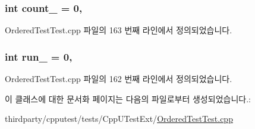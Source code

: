 \subsubsection[{\texorpdfstring{count\+\_\+}{count_}}]{\setlength{\rightskip}{0pt plus 5cm}int count\+\_\+ = 0\hspace{0.3cm}{\ttfamily [static]}, {\ttfamily [private]}}\hypertarget{class_ordered_test_testing_fixture_a9acf5084c965a76d24ec228412256bc3}{}\label{class_ordered_test_testing_fixture_a9acf5084c965a76d24ec228412256bc3}


Ordered\+Test\+Test.\+cpp 파일의 163 번째 라인에서 정의되었습니다.

\subsubsection[{\texorpdfstring{run\+\_\+}{run_}}]{\setlength{\rightskip}{0pt plus 5cm}int run\+\_\+ = 0\hspace{0.3cm}{\ttfamily [static]}, {\ttfamily [private]}}\hypertarget{class_ordered_test_testing_fixture_ad35121377d37568a8e42f8a7ad98b6b4}{}\label{class_ordered_test_testing_fixture_ad35121377d37568a8e42f8a7ad98b6b4}


Ordered\+Test\+Test.\+cpp 파일의 162 번째 라인에서 정의되었습니다.



이 클래스에 대한 문서화 페이지는 다음의 파일로부터 생성되었습니다.\+:\begin{DoxyCompactItemize}
\item 
thirdparty/cpputest/tests/\+Cpp\+U\+Test\+Ext/\hyperlink{_ordered_test_test_8cpp}{Ordered\+Test\+Test.\+cpp}\end{DoxyCompactItemize}
